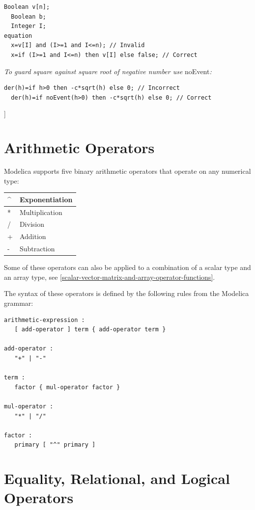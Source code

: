 \documentclass[10pt,a4paper]{report}
\def\doublelabel#1{\label{#1}}
\begin{document}
\begin{lstlisting}[language=modelica]
  Boolean v[n];
  Boolean b;
  Integer I;
equation
  x=v[I] and (I>=1 and I<=n); // Invalid
  x=if (I>=1 and I<=n) then v[I] else false; // Correct
\end{lstlisting}

\emph{To guard square against square root of negative number use}
noEvent\emph{:}
\begin{lstlisting}[language=modelica]
  der(h)=if h>0 then -c*sqrt(h) else 0; // Incorrect
  der(h)=if noEvent(h>0) then -c*sqrt(h) else 0; // Correct
\end{lstlisting}
{]}

\section{Arithmetic Operators}\doublelabel{arithmetic-operators}

Modelica supports five binary arithmetic operators that operate on any
numerical type:


\begin{longtable}[c]{|l|l|}
\^{} & Exponentiation\\ \hline
* & Multiplication\\ \hline
/ & Division\\ \hline
+ & Addition\\ \hline
- & Subtraction\\ \hline
\end{longtable}

Some of these operators can also be applied to a combination of a scalar
type and an array type, see \ref{scalar-vector-matrix-and-array-operator-functions}.

The syntax of these operators is defined by the following rules from the
Modelica grammar:

\begin{lstlisting}[language=grammar]
arithmetic-expression :
   [ add-operator ] term { add-operator term }

add-operator :
   "+" | "-"
   
term :
   factor { mul-operator factor }

mul-operator :
   "*" | "/"
   
factor :
   primary [ "^" primary ]
\end{lstlisting}

\section{Equality, Relational, and Logical Operators}\doublelabel{equality-relational-and-logical-operators}
\end{document}
